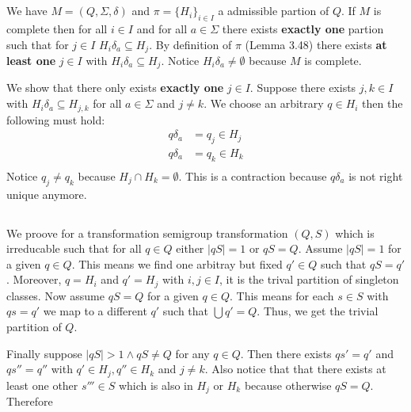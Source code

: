 \documentclass[a4paper,12pt,numbers=noenddot]{scrreport}
\begin{document}

\setcounter{chapter}{4}
\chapter{}
\section{}
We have $M = (Q, \Sigma, \delta)$ and $\pi = \{H_i\}_{i \in I}$ a admissible partion of $Q$.
If $M$ is complete then for all $i \in I$ and for all $a \in \Sigma$ there exists \textbf{exactly one} partion such that for $j \in I$ $H_i\delta_a \subseteq H_j$.
By definition of $\pi$ (Lemma 3.48) there exists \textbf{at least one} $j \in I$ with $H_i\delta_a \subseteq H_j$.
Notice $H_i\delta_a \neq \emptyset$ because $M$ is complete.

We show that there only exists \textbf{exactly one} $j \in I$.
Suppose there exists $j,k \in I$ with $H_i\delta_a \subseteq H_{j,k}$ for all $a \in \Sigma$ and $j \neq k$.
We choose an arbitrary $q \in H_i$ then the following must hold:
\begin{align*}
    q\delta_a &= q_j \in H_j \\
    q\delta_a &= q_k \in H_k \\
\end{align*}
Notice $q_j \neq q_k$ because $H_j \cap H_k = \emptyset$.
This is a contraction because $q\delta_a$ is not right unique anymore.

\section{}
We proove for a transformation semigroup transformation $(Q,S)$ which is irreducable such that for all $q \in Q$ either $|qS| = 1$  or $qS = Q$.
Assume $|qS| = 1$ for a given $q \in Q$. This means we find one arbitray but fixed $q' \in Q$ such that $qS = q'$.
Moreover, $q = H_i$ and $q' = H_j$ with $i,j \in I$, it is the trival partition of singleton classes.
Now assume $qS = Q$ for a given $q \in Q$. This means for each $s \in S$ with $qs = q'$ we map to a different $q'$ such that $\bigcup q' = Q$.
Thus, we get the trivial partition of $Q$.

Finally suppose $|qS| > 1 \land qS \neq Q$ for any $q \in Q$.
Then there exists $qs' = q'$ and $qs'' = q''$ with $q' \in H_j, q'' \in H_k$ and $j \neq k$.
Also notice that that there exists at least one other $s''' \in S$ which is also in $H_j$ or $H_k$ because otherwise $qS = Q$.
Therefore 
\end{document}
